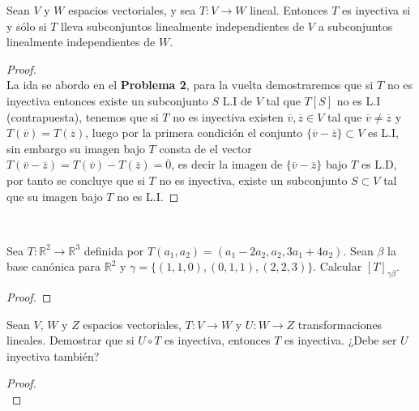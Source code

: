 \documentclass[11pt]{article}
\numberwithin{equation}{section}
\newcommand{\R}{\mathbb{R}}
\begin{document}
\begin{Problema}{} Sean $V$ y $W$ espacios vectoriales, y sea $T: V \to W$ lineal. 
    Entonces $T$ es inyectiva si y sólo si $T$ lleva subconjuntos linealmente 
    independientes de $V$ a subconjuntos linealmente independientes de $W$.
\end{Problema}      
\begin{proof}\,\\
    La ida se abordo en el \textbf{Problema 2}, para la vuelta demostraremos que si $T$ no es inyectiva
    entonces existe un subconjunto $S$ L.I de $V$ tal que $T[S]$ no es L.I (contrapuesta), tenemos que si $T$ no es inyectiva
    existen $\overline{v},\overline{z}\in V$ tal que $\overline{v}\neq \overline{z}$ y $T(\overline{v})=T(\overline{z})$, luego
    por la primera condici\'on el conjunto $\{\overline{v}-\overline{z}\}\subset V$ es L.I, sin embargo  su imagen bajo $T$ consta 
    de el vector $T(\overline{v}-\overline{z})=T(\overline{v})-T(\overline{z})=\overline{0}$, es decir la imagen de $\{\overline{v}-\overline{z}\}$
    bajo $T$ es L.D, por tanto se concluye que si $T$ no es inyectiva, existe un subconjunto $S\subset V$ tal que su imagen bajo $T$
    no es L.I.
\end{proof}\,\\


\begin{Problema}{} Sea $T: \R^2 \to \R^3$ definida por $T(a_1, a_2) = (a_1 - 2a_2, a_2, 3a_1 + 4a_2)$. 
    Sean $\beta$ la base canónica para $\R^2$ y $\gamma = \{(1,1,0), (0,1,1), (2,2,3)\}$. Calcular $[T]_{\gamma \beta}$.
\end{Problema}
\begin{proof}
    
\end{proof}


\begin{Problema}{} Sean $V$, $W$ y $Z$ espacios vectoriales, $T: V \to W$ y $U: W \to Z$ transformaciones lineales. 
    Demostrar que si $U \circ T$ es inyectiva, entonces $T$ es inyectiva. ¿Debe ser $U$ inyectiva también?
\end{Problema}
\begin{proof}\,\\
    
\end{proof}\,\\
\end{document}
